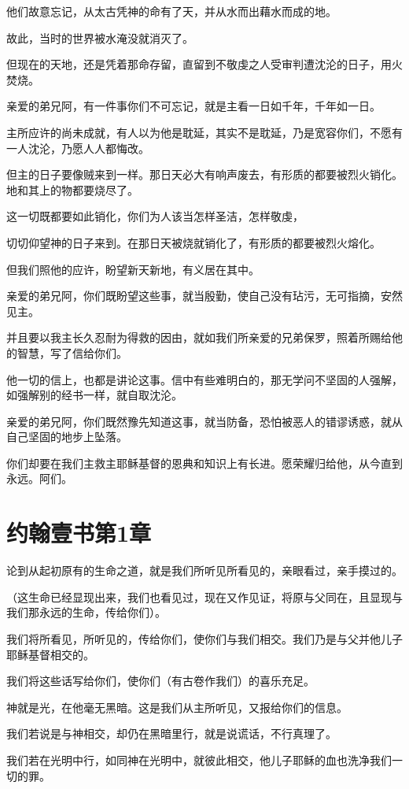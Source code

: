 \documentclass[12pt,oneside]{book}
\begin{document}
他们故意忘记，从太古凭神的命有了天，并从水而出藉水而成的地。

故此，当时的世界被水淹没就消灭了。

但现在的天地，还是凭着那命存留，直留到不敬虔之人受审判遭沈沦的日子，用火焚烧。

亲爱的弟兄阿，有一件事你们不可忘记，就是主看一日如千年，千年如一日。

主所应许的尚未成就，有人以为他是耽延，其实不是耽延，乃是宽容你们，不愿有一人沈沦，乃愿人人都悔改。

但主的日子要像贼来到一样。那日天必大有响声废去，有形质的都要被烈火销化。地和其上的物都要烧尽了。

这一切既都要如此销化，你们为人该当怎样圣洁，怎样敬虔，

切切仰望神的日子来到。在那日天被烧就销化了，有形质的都要被烈火熔化。

但我们照他的应许，盼望新天新地，有义居在其中。

亲爱的弟兄阿，你们既盼望这些事，就当殷勤，使自己没有玷污，无可指摘，安然见主。

并且要以我主长久忍耐为得救的因由，就如我们所亲爱的兄弟保罗，照着所赐给他的智慧，写了信给你们。

他一切的信上，也都是讲论这事。信中有些难明白的，那无学问不坚固的人强解，如强解别的经书一样，就自取沈沦。

亲爱的弟兄阿，你们既然豫先知道这事，就当防备，恐怕被恶人的错谬诱惑，就从自己坚固的地步上坠落。

你们却要在我们主救主耶稣基督的恩典和知识上有长进。愿荣耀归给他，从今直到永远。阿们。

\chapter{约翰壹书第1章}
论到从起初原有的生命之道，就是我们所听见所看见的，亲眼看过，亲手摸过的。

（这生命已经显现出来，我们也看见过，现在又作见证，将原与父同在，且显现与我们那永远的生命，传给你们）。

我们将所看见，所听见的，传给你们，使你们与我们相交。我们乃是与父并他儿子耶稣基督相交的。

我们将这些话写给你们，使你们（有古卷作我们）的喜乐充足。

神就是光，在他毫无黑暗。这是我们从主所听见，又报给你们的信息。

我们若说是与神相交，却仍在黑暗里行，就是说谎话，不行真理了。

我们若在光明中行，如同神在光明中，就彼此相交，他儿子耶稣的血也洗净我们一切的罪。
\end{document}
